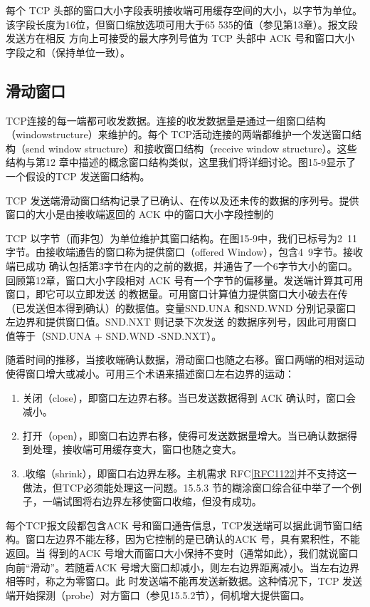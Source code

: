 每个 TCP 头部的窗口大小字段表明接收端可用缓存空间的大小，以字节为单位。该字段长度为16位，但窗口缩放选项可用大于65 535的值（参见第13章）。报文段发送方在相反
方向上可接受的最大序列号值为 TCP 头部中 ACK 号和窗口大小字段之和（保持单位一致）。

\subsection{滑动窗口}
TCP连接的每一端都可收发数据。连接的收发数据量是通过一组窗口结构（windowstructure）来维护的。每个 TCP活动连接的两端都维护一个发送窗口结构（send window
structure）和接收窗口结构（receive window structure）。这些结构与第12 章中描述的概念窗口结构类似，这里我们将详细讨论。图15-9显示了一个假设的TCP 发送窗口结构。

TCP 发送端滑动窗口结构记录了已确认、在传以及还未传的数据的序列号。提供窗口的大小是由接收端返回的 ACK 中的窗口大小字段控制的

TCP 以字节（而非包）为单位维护其窗口结构。在图15-9中，我们已标号为2~11字节。由接收端通告的窗口称为提供窗口（offered Window），包含4~9字节。接收端已成功
确认包括第3字节在内的之前的数据，并通告了一个6字节大小的窗口。回顾第12章，窗口大小字段相对 ACK 号有一个字节的偏移量。发送端计算其可用窗口，即它可以立即发送
的教据量。可用窗口计算值力提供窗口大小破去在传（已发送但本得到确认）的数据值。变量SND.UNA 和SND.WND 分别记录窗口左边界和提供窗口值。SND.NXT 则记录下次发送
的数据序列号，因此可用窗口值等于（SND.UNA + SND.WND -SND.NXT）。

随着时间的推移，当接收端确认数据，滑动窗口也随之右移。窗口两端的相对运动使得窗口增大或减小。可用三个术语来描述窗口左右边界的运动：
\begin{enumerate}
    \item 关闭（close），即窗口左边界右移。当已发送数据得到 ACK 确认时，窗口会减小。
    \item 打开（open），即窗口右边界右移，使得可发送数据量增大。当已确认数据得到处理，接收端可用缓存变大，窗口也随之变大。
    \item .收缩（shrink），即窗口右边界左移。主机需求 RFC\href{https://www.rfc-editor.org/rfc/rfc1122}{[RFC1122]}并不支持这一做法，但TCP必须能处理这一问题。15.5.3 节的糊涂窗口综合征中举了一个例子，一端试图将右边界左移使窗口收缩，但没有成功。
\end{enumerate}

每个TCP报文段都包含ACK 号和窗口通告信息，TCP发送端可以据此调节窗口结构。窗口左边界不能左移，因为它控制的是已确认的ACK 号，具有累积性，不能返回。当
得到的ACK 号增大而窗口大小保持不变时（通常如此），我们就说窗口向前“滑动”。若随着ACK 号增大窗口却减小，则左右边界距离减小。当左右边界相等时，称之为零窗口。此
时发送端不能再发送新数据。这种情况下，TCP 发送端开始探测（probe）对方窗口（参见15.5.2节），伺机增大提供窗口。

